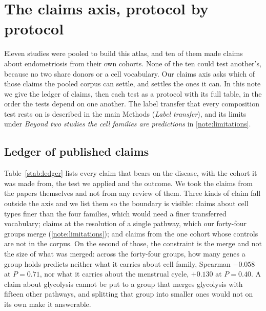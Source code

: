 %
%

\section{The claims axis, protocol by protocol}
\label{note:claims}

Eleven studies were pooled to build this atlas, and ten of them made claims
about endometriosis from their own cohorts. None of the ten could test
another's, because no two share donors or a cell vocabulary. Our claims
axis asks which of those claims the pooled corpus can settle, and settles
the ones it can. In this note we give the ledger of claims, then each test
as a protocol with its full table, in the order the tests depend on one
another. The label transfer that every composition test rests on is described in
the main Methods (\emph{Label transfer}), and its limits under
\emph{Beyond two studies the cell families are predictions} in
\ref{note:limitations}.

\subsection{Ledger of published claims}

Table~\ref{stab:ledger} lists every claim that bears on the disease, with
the cohort it was made from, the test we applied and the outcome. We took
the claims from the papers themselves and not from any review of them.
Three kinds of claim fall outside the axis and we list them so the boundary
is visible: claims about cell types finer than the four families, which
would need a finer transferred vocabulary; claims at the resolution of a
single pathway, which our forty-four groups merge
(\ref{note:limitations}); and claims from the one cohort
whose controls are not in the corpus. On the second of those, the
constraint is the merge and not the size of what was merged: across the
forty-four groups, how many genes a group holds predicts neither what it
carries about cell family, Spearman $-0.058$ at $P = 0.71$, nor what it
carries about the menstrual cycle, $+0.130$ at $P = 0.40$. A claim about
glycolysis cannot be put to a group that merges glycolysis with fifteen
other pathways, and splitting that group into smaller ones would not on its
own make it answerable.

